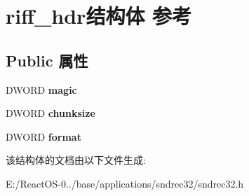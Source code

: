 \hypertarget{structriff__hdr}{}\section{riff\+\_\+hdr结构体 参考}
\label{structriff__hdr}
\subsection*{Public 属性}
\begin{DoxyCompactItemize}
\item 
\mbox{\label{structriff__hdr_a1c2da94526a46188332abe97136ca787}} 
D\+W\+O\+RD {\bfseries magic}
\item 
\mbox{\label{structriff__hdr_a87fc854fcd487ed86ecd95dfe1fd1824}} 
D\+W\+O\+RD {\bfseries chunksize}
\item 
\mbox{\label{structriff__hdr_a2da4a25f13d57f28fadb0e9c2f6fb2c7}} 
D\+W\+O\+RD {\bfseries format}
\end{DoxyCompactItemize}


该结构体的文档由以下文件生成\+:\begin{DoxyCompactItemize}
\item 
E\+:/\+React\+O\+S-\/0../base/applications/sndrec32/sndrec32.\+h\end{DoxyCompactItemize}
